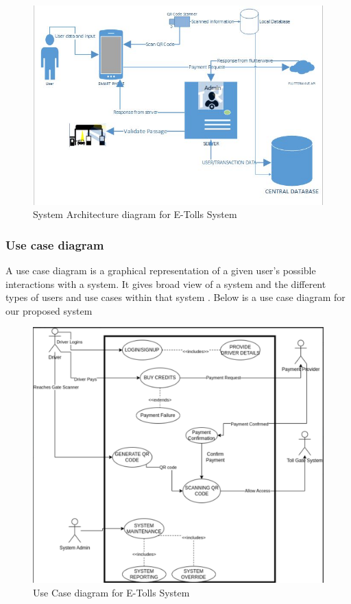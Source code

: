 \begin{figure}[h]
    \begin{center}
        \includegraphics[scale = 0.8]{images/etolssys}
        \caption{System Architecture diagram for E-Tolls System}
    \end{center}
\end{figure}

\clearpage

\clearpage

\subsubsection{Use case diagram}
A use case diagram is a graphical representation of a given user's possible interactions with a system. It gives broad view of a system and the different types of users and use cases within that system \cite{alhir2003learning}.
Below is a use case diagram for our proposed system
\begin{figure}[h]
    \begin{center}
        \hspace{-0.6cm}
        \includegraphics[scale = 0.45]{images/use case diagram}
        \caption{Use Case diagram for E-Tolls System}
    \end{center}
\end{figure}

